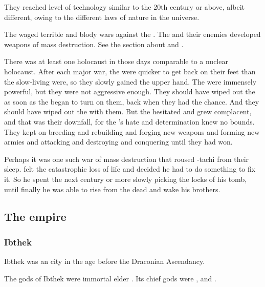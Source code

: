 They reached level of technology similar to the 20th century or above, albeit different, owing to the different laws of nature in the \Miith universe.

The \aryothim waged terrible and blody wars against the \ophidians. 
The \aryothim and their \quiljaaran enemies developed weapons of mass destruction. 
See the section about  and . 

There was at least one holocaust in those days comparable to a nuclear holocaust. 
After each major war, the \aryothim were quicker to get back on their feet than the slow-living \quiljaaran were, so they slowly gained the upper hand. 
The \ophidians were immensely powerful, but they were not aggressive enough.
They should have wiped out the \aryothim as soon as the \aryothim began to turn on them, back when they had the chance.
And they should have wiped out the \nephilim with them.
But the \ophidians hesitated and grew complacent, and that was their downfall, for the \aryothim's hate and determination knew no bounds. 
They kept on breeding and rebuilding and forging new weapons and forming new armies and attacking and destroying and conquering until they had won. 

Perhaps it was one such war of mass destruction that roused \Nexagglachel-tachi from their sleep. 
\Nexagglachel felt the catastrophic loss of life and decided he had to do something to fix it. 
So he spent the next century or more slowly picking the locks of his tomb, until finally he was able to rise from the dead and wake his brothers. 









\subsection{The \aryoth empire}





\subsubsection{Ibthek}
Ibthek was an \aryoth city in the age before the Draconian Ascendancy. 

The gods of Ibthek were immortal elder \aryothim.
Its chief gods were ,  and .

